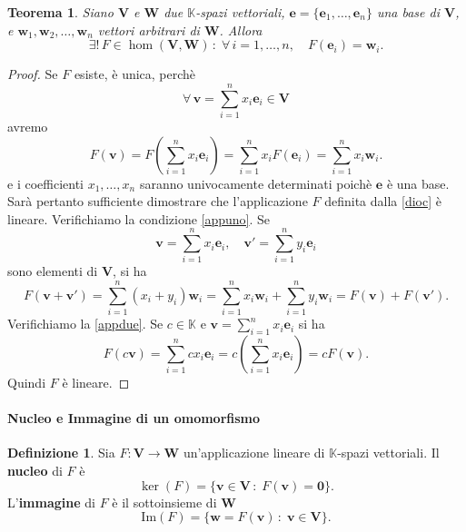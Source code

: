 \documentclass{article}
\theoremstyle{plain}
\newtheorem{thm}{Teorema}[section]
\theoremstyle{definition}
\newtheorem{defn}{Definizione}[section]
\theoremstyle{remark}
\begin{document}
\begin{bxthm}
\begin{thm}\label{importante}
    Siano $\mathbf{V}$ e $\mathbf{W}$ due $\mathbb{K}$-spazi vettoriali, $\mathbf{e}=\{\mathbf{e}_1,\ldots,\mathbf{e}_n\}$ una base di $\mathbf{V}$, 
    e $\mathbf{w}_1,\mathbf{w}_2,\ldots,\mathbf{w}_n$ vettori arbitrari di $\mathbf{W}$. Allora 
    \[\exists!\,F\in\hom(\mathbf{V},\mathbf{W})\,:\;\forall\,i=1,\ldots,n,\quad F(\mathbf{e}_i)=\mathbf{w}_i.\]
\end{thm}
\end{bxthm}
\begin{proof}
    Se $F$ esiste, è unica, perchè 
    \[\forall\,\mathbf{v}=\sum_{i=1}^{n}x_i\mathbf{e}_i\in\mathbf{V}\]
    avremo
    \begin{equation}\label{dioc}
        F(\mathbf{v})=F\left(\sum_{i=1}^{n}x_i\mathbf{e}_i\right)=\sum_{i=1}^{n}x_i F(\mathbf{e}_i)=\sum_{i=1}^{n}x_i\mathbf{w}_i.
    \end{equation}
    e i coefficienti $x_1,\ldots,x_n$ saranno univocamente determinati poichè $\mathbf{e}$ è una base.
    Sarà pertanto sufficiente dimostrare che l'applicazione $F$ definita dalla \ref{dioc} è lineare. Verifichiamo la condizione \ref{appuno}. 
    Se 
    \[\mathbf{v}=\sum_{i=1}^{n}x_i\mathbf{e}_i,\quad\mathbf{v}'=\sum_{i=1}^{n}y_i\mathbf{e}_i\]
    sono elementi di $\mathbf{V}$, si ha 
    \[F(\mathbf{v}+\mathbf{v}')=\sum_{i=1}^{n}(x_i+y_i)\mathbf{w}_i=\sum_{i=1}^{n}x_i\mathbf{w}_i+\sum_{i=1}^{n}y_i\mathbf{w}_i=F(\mathbf{v})+F(\mathbf{v}').\]
    Verifichiamo la \ref{appdue}. Se $c\in\mathbb{K}$ e $\mathbf{v}=\sum_{i=1}^{n}x_i\mathbf{e}_i$ si ha 
    \[F(c\mathbf{v})=\sum_{i=1}^{n}cx_i\mathbf{e}_i=c\left(\sum_{i=1}^{n}x_i\mathbf{e}_i\right)=cF(\mathbf{v}).\]
    Quindi $F$ è lineare.
\end{proof}

\vspace{10pt}

\paragraph{Nucleo e Immagine di un omomorfismo}
\begin{bxthm}
\begin{defn}\label{intendiquesta}
    Sia $F:\mathbf{V}\to\mathbf{W}$ un'applicazione lineare di $\mathbb{K}$-spazi vettoriali. 
    Il \textbf{nucleo} di $F$ è 
    \[\ker(F)=\{\mathbf{v}\in\mathbf{V}\,:\;F(\mathbf{v})=\mathbf{0}\}.\]
    L'\textbf{immagine}  di $F$ è il sottoinsieme di $\mathbf{W}$
    \[\mathrm{Im}(F)=\{\mathbf{w}=F(\mathbf{v})\,:\;\mathbf{v}\in\mathbf{V}\}.\]    
\end{defn}
\end{bxthm}
\end{document}
